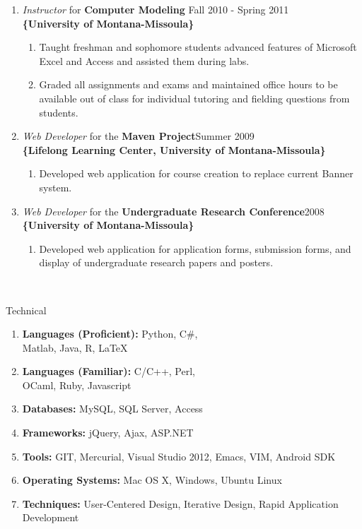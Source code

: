 \documentclass[oneside]{article}%
\begin{document}
\begin{enumerate}[]
	\item \textit{Instructor} for \textbf{Computer Modeling} \hfill Fall 2010 -  Spring 2011\\
		\textbf{\{University of Montana-Missoula\}}
		\begin{enumerate}[*]
			\item Taught freshman and sophomore students advanced features of Microsoft Excel and Access and assisted them during labs.
			\item Graded all assignments and exams and maintained office hours to be available out of class for individual tutoring and fielding questions from students.
		\end{enumerate}

	\item \textit{Web Developer} for the \textbf{Maven Project}\hfill Summer 2009\\
		\textbf{\{Lifelong Learning Center, University of Montana-Missoula\}} 
		\begin{enumerate}[*]
			\item Developed web application for course creation to replace current Banner system.
		\end{enumerate}

	\item \textit{Web Developer} for the \textbf{Undergraduate Research Conference}\hfill 2008\\
		\textbf{\{University of Montana-Missoula\}}
		\begin{enumerate}[*]
			\item Developed web application for application forms, submission forms, and display of undergraduate research papers and posters.
		\end{enumerate}
\end{enumerate}
\

\noindent
\huge{Technical}
\normalsize
\begin{enumerate}[]
	\item \textbf{Languages (Proficient):} Python, C\#,\\ Matlab, Java, R, \LaTeX
	\item \textbf{Languages (Familiar):} C/C++, Perl, \\OCaml, Ruby, Javascript
	\item \textbf{Databases:} MySQL, SQL Server, Access
	\item \textbf{Frameworks:} jQuery, Ajax, ASP.NET
	\item \textbf{Tools:} GIT, Mercurial, Visual Studio 2012, Emacs, VIM, Android SDK
	\item \textbf{Operating Systems:} Mac OS X, Windows, Ubuntu Linux
	\item \textbf{Techniques:} User-Centered Design, Iterative Design, Rapid Application Development
\end{enumerate}
\end{document}
